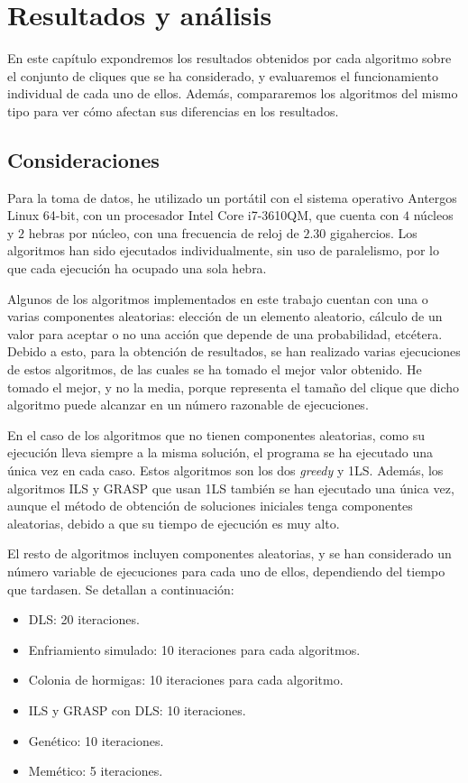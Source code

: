 \chapter{Resultados y análisis}\label{ch:resultados}

En este capítulo expondremos los resultados obtenidos por cada algoritmo sobre el
conjunto de cliques que se ha considerado, y evaluaremos el funcionamiento individual
de cada uno de ellos. Además, compararemos los algoritmos del mismo tipo para ver cómo
afectan sus diferencias en los resultados.

\section{Consideraciones}

Para la toma de datos, he utilizado un portátil con el sistema operativo Antergos
Linux 64-bit, con un procesador Intel Core i7-3610QM, que cuenta con $4$ núcleos
y $2$ hebras por núcleo, con una frecuencia de reloj de $2.30$ gigahercios. Los
algoritmos han sido ejecutados individualmente, sin uso de paralelismo, por lo que
cada ejecución ha ocupado una sola hebra.

Algunos de los algoritmos implementados en este trabajo cuentan con una o varias
componentes aleatorias: elección de un elemento aleatorio, cálculo de un valor para
aceptar o no una acción que depende de una probabilidad, etcétera. Debido a esto,
para la obtención de resultados, se han realizado varias ejecuciones de estos algoritmos,
de las cuales se ha tomado el mejor valor obtenido. He tomado el mejor, y no la media,
porque representa el tamaño del clique que dicho algoritmo puede alcanzar en un
número razonable de ejecuciones.

En el caso de los algoritmos que no tienen componentes aleatorias, como su ejecución
lleva siempre a la misma solución, el programa se ha ejecutado una única vez en
cada caso. Estos algoritmos son los dos \textit{greedy} y 1LS. Además, los algoritmos
ILS y GRASP que usan 1LS también se han ejecutado una única vez, aunque el método
de obtención de soluciones iniciales tenga componentes aleatorias, debido a que su
tiempo de ejecución es muy alto.

El resto de algoritmos incluyen componentes aleatorias, y se han considerado un
número variable de ejecuciones para cada uno de ellos, dependiendo del tiempo que
tardasen. Se detallan a continuación:
\begin{itemize}
  \item DLS: 20 iteraciones.
  \item Enfriamiento simulado: 10 iteraciones para cada algoritmos.
  \item Colonia de hormigas: 10 iteraciones para cada algoritmo.
  \item ILS y GRASP con DLS: 10 iteraciones.
  \item Genético: 10 iteraciones.
  \item Memético: 5 iteraciones.
\end{itemize}

